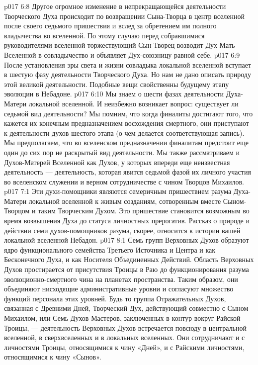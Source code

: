 \vs p017 6:8 \pc {}\bibnobreakspace {} Другое огромное изменение в непрекращающейся деятельности Творческого Духа происходит по возвращении Сына\hyp{}Творца в центр вселенной после своего седьмого пришествия и вслед за обретением им полного владычества во вселенной. По этому случаю перед собравшимися руководителями вселенной торжествующий Сын\hyp{}Творец возводит Дух\hyp{}Мать Вселенной в совладычество и объявляет Дух\hyp{}союзницу равной себе.
\vs p017 6:9 \pc {}\bibnobreakspace {} После установления эры света и жизни совладыка локальной вселенной вступает в шестую фазу деятельности Творческого Духа. Но нам не дано описать природу этой великой деятельности. Подобные вещи свойственны будущему этапу эволюции в Небадоне.
\vs p017 6:10 \pc {}\bibnobreakspace {} Мы знаем о шести фазах деятельности Духа\hyp{}Матери локальной вселенной. И неизбежно возникает вопрос: существует ли седьмой вид деятельности? Мы помним, что когда финалиты достигают того, что кажется их конечным предназначением восхождения смертного, они приступают к деятельности духов шестого этапа (о чем делается соответствующая запись). Мы предполагаем, что во вселенском предназначении финалитам предстоит еще один до сих пор не раскрытый вид деятельности. Мы также рассматриваем и Духов\hyp{}Матерей Вселенной как Духов, у которых впереди еще неизвестная деятельность --- деятельность, которая явится седьмой фазой их личного участия во вселенском служении и верном сотрудничестве с чином Творцов Михаилов.
\vs p017 7:1 Эти духи\hyp{}помощники являются семеричным пришествием разума Духа\hyp{}Матери локальной вселенной к живым созданиям, сотворенным вместе Сыном\hyp{}Творцом и таким Творческим Духом. Это пришествие становится возможным во время возвышения Духа до статуса личностных прерогатив. Рассказ о природе и действии семи духов\hyp{}помощников разума, скорее, относится к истории вашей локальной вселенной Небадон.
\vs p017 8:1 Семь групп Верховных Духов образуют ядро функционального семейства Третьего Источника и Центра и как Бесконечного Духа, и как Носителя Объединенных Действий. Область Верховных Духов простирается от присутствия Троицы в Раю до функционирования разума эволюционно\hyp{}смертного чина на планетах пространства. Таким образом, они объединяют нисходящие административные уровни и согласуют множество функций персонала этих уровней. Будь то группа Отражательных Духов, связанная с Древними Дней, Творческий Дух, действующий совместно с Сыном Михаилом, или Семь Духов\hyp{}Мастеров, заключенных в контур вокруг Райской Троицы, --- деятельность Верховных Духов встречается повсюду в центральной вселенной, в сверхвселенных и в локальных вселенных. Они сотрудничают и с личностями Троицы, относящимися к чину «Дней», и с Райскими личностями, относящимися к чину «Сынов».
